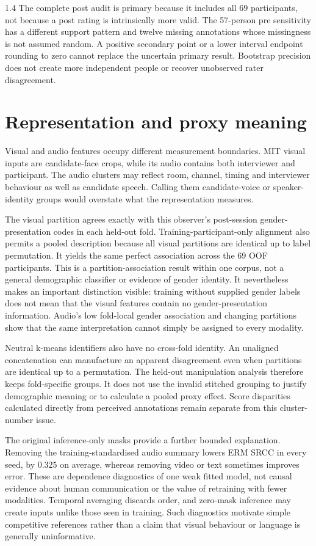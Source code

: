 \begin{spacing}{1.4}
The complete post audit is primary because it includes all 69 participants, not because
a post rating is intrinsically more valid. The 57-person pre sensitivity has a different
support pattern and twelve missing annotations whose missingness is not assumed random.
A positive secondary point or a lower interval endpoint rounding to zero cannot replace
the uncertain primary result. Bootstrap precision does not create more independent
people or recover unobserved rater disagreement.

\section{Representation and proxy meaning}

Visual and audio features occupy different measurement boundaries. MIT visual inputs are
candidate-face crops, while its audio contains both interviewer and participant.
The audio clusters may reflect room, channel, timing and interviewer behaviour as well as
candidate speech. Calling them candidate-voice or speaker-identity groups would overstate
what the representation measures.

The visual partition agrees exactly with this observer's post-session
gender-presentation codes in each held-out fold. Training-participant-only alignment
also permits a pooled description because all visual partitions are identical up to
label permutation. It yields the same perfect association across the 69 OOF
participants. This is a partition-association result within one corpus, not a general
demographic classifier or evidence of gender identity. It nevertheless makes an
important distinction visible: training without supplied gender labels does not mean
that the visual features contain no gender-presentation information. Audio's low
fold-local gender association and changing partitions show that the same interpretation
cannot simply be assigned to every modality.

Neutral k-means identifiers also have no cross-fold identity. An unaligned concatenation
can manufacture an apparent disagreement even when partitions are identical up to a
permutation. The held-out manipulation analysis therefore keeps fold-specific groups.
It does not use the invalid stitched grouping to justify demographic meaning or to
calculate a pooled proxy effect. Score disparities calculated directly from perceived
annotations remain separate from this cluster-number issue.

The original inference-only masks provide a further bounded explanation. Removing the
training-standardised audio summary lowers ERM SRCC in every seed, by 0.325 on average,
whereas removing video or text sometimes improves error. These are dependence diagnostics
of one weak fitted model, not causal evidence about human communication or the value of
retraining with fewer modalities. Temporal averaging discards order, and zero-mask
inference may create inputs unlike those seen in training. Such diagnostics motivate
simple competitive references rather than a claim that visual behaviour or language is
generally uninformative.


\end{spacing}
